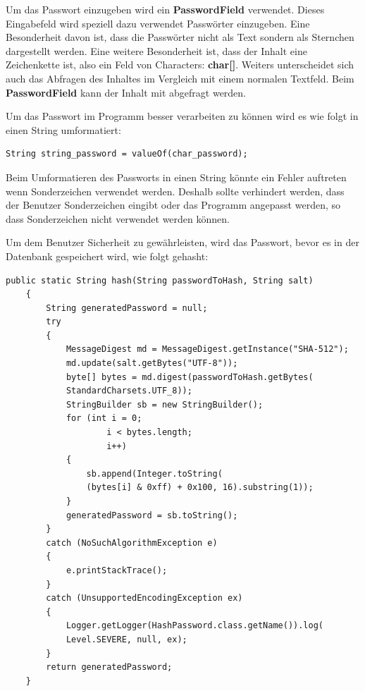 \vspace{10pt}

Um das Passwort einzugeben wird ein \textbf{PasswordField} verwendet. Dieses Eingabefeld wird speziell dazu verwendet Passwörter einzugeben. Eine Besonderheit davon ist, dass die Passwörter nicht als Text sondern als Sternchen dargestellt werden. Eine weitere Besonderheit ist, dass der Inhalt eine Zeichenkette ist, also ein Feld von Characters: \textbf{char[]}. Weiters unterscheidet sich auch das Abfragen des Inhaltes im Vergleich mit einem normalen Textfeld. Beim \textbf{PasswordField} kann der Inhalt mit  abgefragt werden.

\newpage

Um das Passwort im Programm besser verarbeiten zu können wird es wie folgt in einen String umformatiert:
\begin{lstlisting}[style=Javastyle, caption=char zu String]
	String string_password = valueOf(char_password);
\end{lstlisting}
Beim Umformatieren des Passworts in einen String könnte ein Fehler auftreten wenn Sonderzeichen verwendet werden. Deshalb sollte verhindert werden, dass der Benutzer Sonderzeichen eingibt oder das Programm angepasst werden, so dass Sonderzeichen nicht verwendet werden können.

\vspace{10pt}

Um dem Benutzer Sicherheit zu gewährleisten, wird das Passwort, bevor es in der Datenbank gespeichert wird, wie folgt gehasht: 
\begin{lstlisting}[style=Javastyle, caption=Hash Passwort]
    public static String hash(String passwordToHash, String salt)
    {
        String generatedPassword = null;
        try
        {
            MessageDigest md = MessageDigest.getInstance("SHA-512");
            md.update(salt.getBytes("UTF-8"));
            byte[] bytes = md.digest(passwordToHash.getBytes(
            StandardCharsets.UTF_8));
            StringBuilder sb = new StringBuilder();
            for (int i = 0;
                    i < bytes.length;
                    i++)
            {
                sb.append(Integer.toString(
                (bytes[i] & 0xff) + 0x100, 16).substring(1));
            }
            generatedPassword = sb.toString();
        }
        catch (NoSuchAlgorithmException e)
        {
            e.printStackTrace();
        }
        catch (UnsupportedEncodingException ex)
        {
            Logger.getLogger(HashPassword.class.getName()).log(
            Level.SEVERE, null, ex);
        }
        return generatedPassword;
    }
\end{lstlisting}

